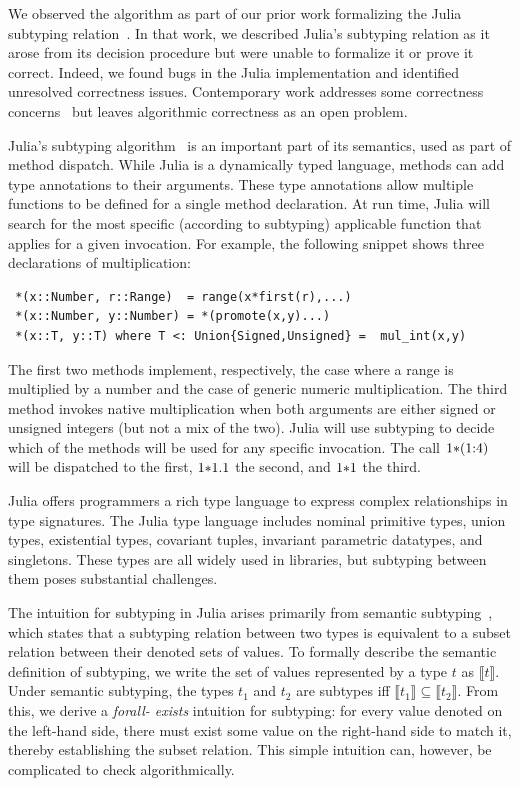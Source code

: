 \documentclass[a4paper,english]{lipics-v2019}
\newcommand{\denotes}[1]{\llbracket #1 \rrbracket}
\renewcommand{\c}[1]{\ensuremath{\text{\lstinline{#1}}}\xspace}
\begin{document}
We observed the algorithm as part of our prior work formalizing the Julia
subtyping relation~\cite{DBLP:NardelliBPCBV18}. In that work, we described
Julia's subtyping relation as it arose from its decision procedure but
were unable to formalize it or prove it correct. Indeed, we found bugs in the
Julia implementation and identified unresolved correctness issues. Contemporary
work addresses some correctness concerns~\cite{yuliasubtyping} but leaves algorithmic
correctness as an open problem.

Julia's subtyping algorithm~\cite{bezansonthesis} is an important part of its
semantics, used as part of method dispatch. While Julia is a dynamically typed
language, methods can add type annotations to their arguments. These type
annotations allow multiple functions to be defined for a single method
declaration. At run time, Julia will search for the most specific (according to
subtyping) applicable function that applies for a given invocation.  For
example, the following snippet shows three declarations of multiplication:

\begin{lstlisting}
 *(x::Number, r::Range)  = range(x*first(r),...)
 *(x::Number, y::Number) = *(promote(x,y)...)
 *(x::T, y::T) where T <: Union{Signed,Unsigned} =  mul_int(x,y)
\end{lstlisting}

\noindent The first two methods implement, respectively, the case where a
range is multiplied by a number and the case of generic numeric multiplication. The
third method invokes native multiplication when both arguments are either
signed or unsigned integers (but not a mix of the two). Julia will use subtyping
to decide which of the methods will be used for any specific invocation. The call
\c{1*(1:4)} will be dispatched to the first, \c{1*1.1} the second, and \c{1*1} the third.

Julia offers programmers a rich type language to express complex relationships
in type signatures. The Julia type language includes nominal primitive types,
union types, existential types, covariant tuples, invariant parametric
datatypes, and singletons. These types are all widely used in libraries, but
subtyping between them poses substantial challenges. 

The intuition for subtyping in Julia arises primarily from semantic
subtyping~\cite{BezansonEKS17}, which states that a subtyping relation between
two types is equivalent to a subset relation between their denoted  sets of
values. To formally describe the semantic definition of subtyping, we write
the set of values represented by a type $t$ as {\small $\denotes{t}$}. Under
semantic subtyping, the types $t_1$ and $t_2$ are subtypes iff {\small
$\denotes{t_1} \subseteq \denotes{t_2}$}. From this, we derive a \emph{forall-
exists} intuition for subtyping: for every value denoted on the left-hand
side, there must exist some value on the right-hand side to match it, thereby
establishing the subset relation. This simple intuition can, however, be
complicated to check algorithmically.
\end{document}
